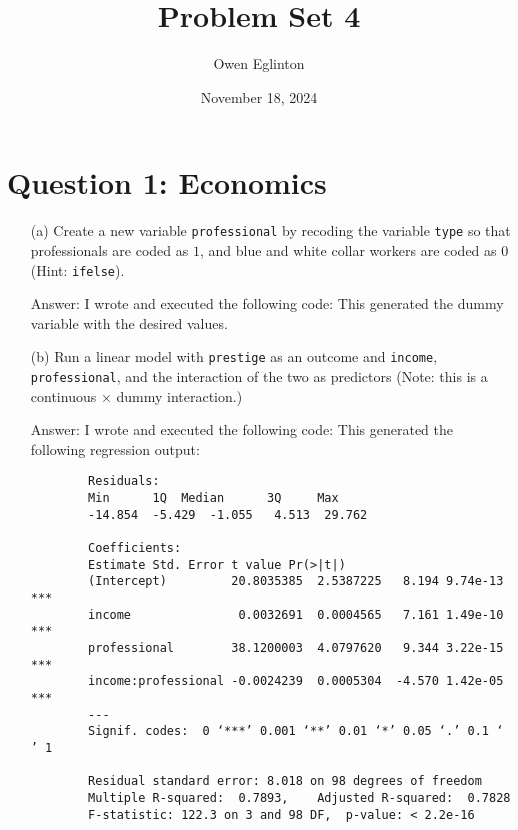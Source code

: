 \documentclass[12pt,letterpaper]{article}
\title{Problem Set 4}
\date{November 18, 2024}
\author{Owen Eglinton}
\begin{document}
\maketitle
\section*{Question 1: Economics}
\vspace{.25cm}

\begin{enumerate}
\vspace{.25cm}
	
	\item [(a)]
	Create a new variable \texttt{professional} by recoding the variable \texttt{type} so that professionals are coded as $1$, and blue and white collar workers are coded as $0$ (Hint: \texttt{ifelse}).
	\vspace{.25cm}
	
	\item [Answer:]
	I wrote and executed the following code:  This generated the dummy variable with the desired values.
	\vspace{1cm}
	
	
	\item [(b)]
	Run a linear model with \texttt{prestige} as an outcome and \texttt{income}, \texttt{professional}, and the interaction of the two as predictors (Note: this is a continuous $\times$ dummy interaction.)
	\vspace{.025cm}
	
	\item [Answer:]
	I wrote and executed the following code:  This generated the following regression output: \begin{verbatim} 
		Residuals:
		Min      1Q  Median      3Q     Max 
		-14.854  -5.429  -1.055   4.513  29.762 
		
		Coefficients:
		Estimate Std. Error t value Pr(>|t|)    
		(Intercept)         20.8035385  2.5387225   8.194 9.74e-13 ***
		income               0.0032691  0.0004565   7.161 1.49e-10 ***
		professional        38.1200003  4.0797620   9.344 3.22e-15 ***
		income:professional -0.0024239  0.0005304  -4.570 1.42e-05 ***
		---
		Signif. codes:  0 ‘***’ 0.001 ‘**’ 0.01 ‘*’ 0.05 ‘.’ 0.1 ‘ ’ 1
		
		Residual standard error: 8.018 on 98 degrees of freedom
		Multiple R-squared:  0.7893,	Adjusted R-squared:  0.7828 
		F-statistic: 122.3 on 3 and 98 DF,  p-value: < 2.2e-16
		\end{verbatim}
	\vspace{1cm}
	

\end{enumerate}
\end{document}
